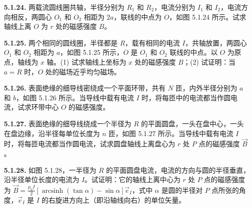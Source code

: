 \begin{center}
\end{center}

\vfill
\newpage

\textbf{5.1.24.} 两载流圆线圈共轴，半径分别为 $R_{1}$ 和 $R_{2}$，电流分别为 $I_{1}$ 和 $I_{2}$，电流方向相反，两圆心 $O_{1}$ 和 $O_{2}$ 相距为 $2a$，联线的中点为 $O$，如图 5.1.24 所示。试求轴线上离 $O$ 为 $r$ 处的磁感强度 $B$。

\begin{center}
\end{center}

\vfill
\newpage

\textbf{5.1.25.} 两个相同的圆线圈，半径都是 $R$，载有相同的电流 $I$，共轴放置，两圆心 $O_{1}$ 和 $O_{2}$ 相距为 $a$，如图 5.1.25 所示，$O$ 是 $O_{1}$ 和 $O_{2}$ 联线的中点。以 $O$ 为原点，轴线为 $x$ 轴。(1) 试求轴线上坐标为 $x$ 处的磁感强度 $B$；(2) 试证明：当 $a = R$ 时，$O$ 处的磁场近乎均匀磁场。

\begin{center}
\end{center}

\vfill
\newpage

\textbf{5.1.26.} 表面绝缘的细导线密绕成一个平面环带，共有 $N$ 匝，内外半径分别为 $a$ 和 $b$，如图 5.1.26 所示。当导线中载有电流 $I$ 时，将每匝中的电流都当作圆电流，试求环带中心 $O$ 的磁感强度。

\begin{center}
\end{center}

\vfill
\newpage

\textbf{5.1.27.} 表面绝缘的细导线绕成一个半径为 $R$ 的平面圆盘，一头在盘中心，一头在盘边缘，沿半径每单位长度为 $n$ 匝，如图 5.1.27 所示。当导线中载有电流 $I$ 时，将每匝电流都当作圆电流，试求圆盘轴线上离盘心为 $r$ 处 $P$ 点的磁感强度 $\vec{B}$。

\begin{center}
\end{center}

\vfill
\newpage

\textbf{5.1.28.} 如图 5.1.28，一半径为 $R$ 的平面圆盘电流，电流的方向与圆的半径垂直，沿半径单位长度的电流为 $I$。试证明：它的轴线上离中心为 $r$ 处 $P$ 点的磁感强度为 $\displaystyle \vec{B}=\frac{\mu_{0}I}{2}\left[\operatorname{arcsinh}(\tan\alpha)-\sin\alpha\right]\vec{e}_{I}$，式中 $\alpha$ 是圆的半径对 $P$ 点所张的角度，$\vec{e}_{I}$ 是 $I$ 的右旋进方向上（即沿轴线向右）的单位矢量。

